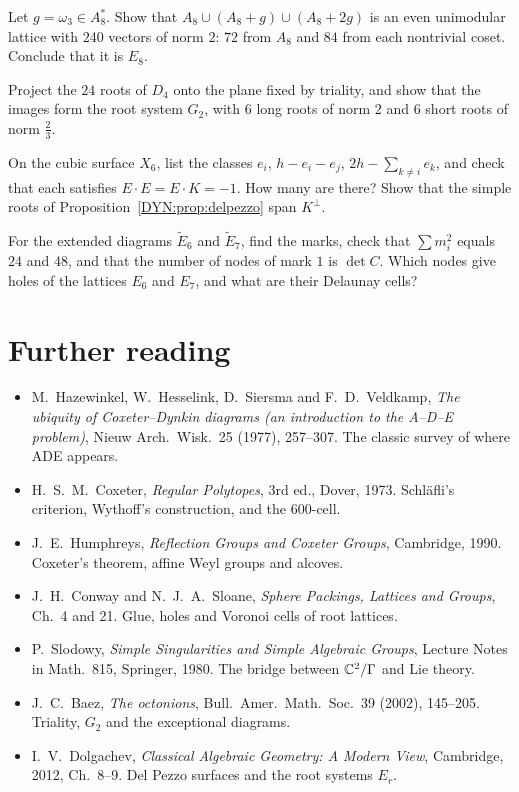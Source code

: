 \begin{exercise}
Let $g=\omega_3\in A_8^*$. Show that $A_8\cup(A_8+g)\cup(A_8+2g)$ is an even unimodular lattice with $240$
vectors of norm $2$: $72$ from $A_8$ and $84$ from each nontrivial coset. Conclude that it is $E_8$.
\end{exercise}

\begin{exercise}
Project the $24$ roots of $D_4$ onto the plane fixed by triality, and show that the images form the root
system $G_2$, with $6$ long roots of norm $2$ and $6$ short roots of norm $\frac23$.
\end{exercise}

\begin{exercise}
On the cubic surface $X_6$, list the classes $e_i$, $h-e_i-e_j$, $2h-\sum_{k\ne i}e_k$, and check that each
satisfies $E\cdot E=E\cdot K=-1$. How many are there? Show that the simple roots of
Proposition~\ref{DYN:prop:delpezzo} span $K^\perp$.
\end{exercise}

\begin{exercise}
For the extended diagrams $\tilde E_6$ and $\tilde E_7$, find the marks, check that $\sum m_i^2$ equals
$24$ and $48$, and that the number of nodes of mark $1$ is $\det C$. Which nodes give holes of the
lattices $E_6$ and $E_7$, and what are their Delaunay cells?
\end{exercise}

\section*{Further reading}
\begin{itemize}[nosep]
\item M.~Hazewinkel, W.~Hesselink, D.~Siersma and F.~D.~Veldkamp, \emph{The ubiquity of Coxeter--Dynkin
  diagrams (an introduction to the A--D--E problem)}, Nieuw Arch.\ Wisk.~25 (1977), 257--307. The
  classic survey of where ADE appears.
\item H.~S.~M.~Coxeter, \emph{Regular Polytopes}, 3rd ed., Dover, 1973. Schl\"afli's criterion, Wythoff's
  construction, and the $600$-cell.
\item J.~E.~Humphreys, \emph{Reflection Groups and Coxeter Groups}, Cambridge, 1990. Coxeter's theorem,
  affine Weyl groups and alcoves.
\item J.~H.~Conway and N.~J.~A.~Sloane, \emph{Sphere Packings, Lattices and Groups}, Ch.~4 and 21. Glue,
  holes and Voronoi cells of root lattices.
\item P.~Slodowy, \emph{Simple Singularities and Simple Algebraic Groups}, Lecture Notes in Math.~815,
  Springer, 1980. The bridge between $\mathbb{C}^2/\Gamma$ and Lie theory.
\item J.~C.~Baez, \emph{The octonions}, Bull.\ Amer.\ Math.\ Soc.~39 (2002), 145--205. Triality, $G_2$ and
  the exceptional diagrams.
\item I.~V.~Dolgachev, \emph{Classical Algebraic Geometry: A Modern View}, Cambridge, 2012, Ch.~8--9.
  Del Pezzo surfaces and the root systems $E_r$.
\end{itemize}
